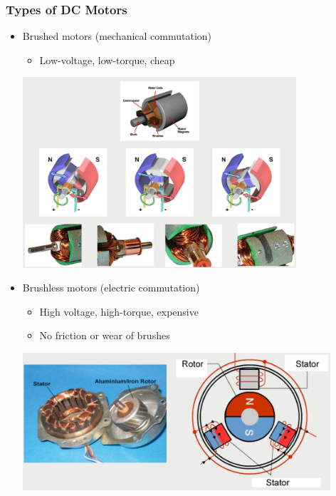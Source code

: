 \documentclass[10pt]{article}
\begin{document}
\subsubsection*{Types of DC Motors}
\begin{itemize}
	\item Brushed motors (mechanical commutation)
	\begin{itemize}
        \item Low-voltage, low-torque, cheap
    \end{itemize}
    \begin{center} 
        \includegraphics*[width=0.8\textwidth]{L2_9.png} 
    \end{center}
    \item Brushless motors (electric commutation)
    \begin{itemize}
        \item High voltage, high-torque, expensive
        \item No friction or wear of brushes
    \end{itemize}
    \begin{center} 
        \includegraphics*[width=0.9\textwidth]{L2_10.png} 
    \end{center}
\end{itemize}
\end{document}
